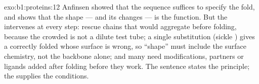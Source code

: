 \begin{solution}{exo:b1:proteins:12}
Anfinsen showed that the sequence suffices to specify the fold, and
 shows that the shape --- and its changes --- is the function.
But the  intervenes at every step:  rescue chains that
would aggregate before folding, because the crowded  is not a
dilute test tube; a single substitution (sickle ) gives a
correctly folded  whose surface is wrong, so ``shape'' must
include the surface chemistry, not the backbone alone; and many
 need modifications, partners or ligands added after folding
before they work. The sentence states the principle; the  supplies
the conditions.
\end{solution}


